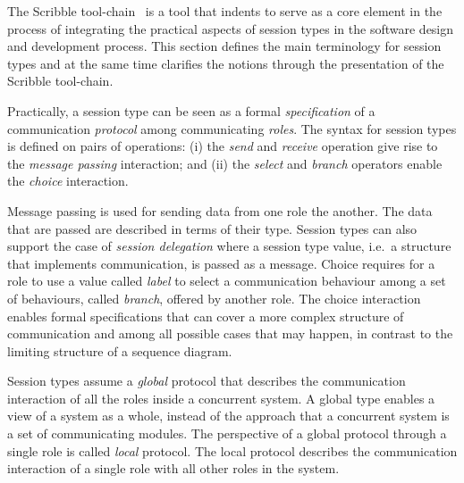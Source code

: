 The Scribble tool-chain~\cite{scribble} is a tool that indents
to serve as a core element in the process of integrating
the practical aspects of session types in the software
design and development process. This section defines
the main terminology for session types and at the same
time clarifies the notions through the presentation
of the Scribble tool-chain.

Practically, a session type can be seen as a formal
{\em specification} of a communication {\em protocol} among communicating {\em roles}.
The syntax for session types is defined on pairs of operations:
(i) the {\em send} and {\em receive} operation give rise to
the {\em message passing} interaction; and
(ii) the {\em select} and {\em branch} operators enable the
{\em choice} interaction.

Message passing is used for sending data from one role the another.
The data that are passed are described in terms of their type. Session
types can also support the case of {\em session delegation}
where a session type value, i.e.~a structure that implements communication,
is passed as a message.
Choice requires for a role to use a value called {\em label}
to select a communication behaviour among
a set of behaviours, called {\em branch}, offered by another role.
The choice interaction enables formal specifications that can
cover a more complex structure of communication and among all possible
cases that may happen, in contrast to the limiting structure of
a sequence diagram.

Session types assume a {\em global} protocol that describes the
communication interaction of all the roles inside a concurrent system.
A global type enables a view of a system as a whole, instead of the 
approach that a concurrent system is a set of communicating modules.
The perspective of a global protocol through a single role
is called {\em local} protocol. The local protocol describes
the communication interaction of a single role with all other roles
in the system.


